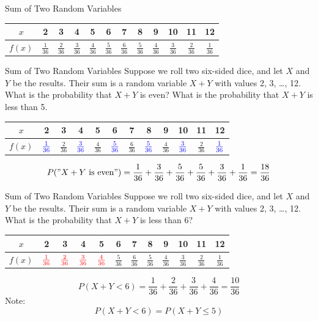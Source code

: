 \documentclass[handout]{beamer}
\newcommand{\blue}[1]{{\color{blue} #1}}
\newcommand{\red}[1]{{\color{red} #1}}
\begin{document}
\begin{frame}{Sum of Two Random Variables}
\begin{center}
    \vspace{-.5cm}
    \renewcommand{\arraystretch}{1.5}
    \begin{tabular}{c||c|c|c|c|c|c|c|c|c|c|c|}
    $x$ & 2 & 3 & 4 & 5 & 6 & 7 & 8 & 9 & 10 & 11 & 12 \\ \hline
    $f(x)$ & $\frac1{36}$ & $\frac2{36}$ & $\frac3{36}$ & $\frac4{36}$ & $\frac5{36}$ & $\frac6{36}$ & $\frac5{36}$ & $\frac4{36}$ & $\frac3{36}$ & $\frac2{36}$ & $\frac1{36}$
    \end{tabular}
    \end{center}
\end{frame}

\begin{frame}{Sum of Two Random Variables}
    Suppose we roll two six-sided dice, and let $X$ and $Y$ be the results. Their sum is a random variable $X+Y$ with values 2, 3, \dots, 12. What is the probability that $X+Y$ is even?  What is the probability that $X+Y$ is less than 5.
    
    \begin{center}
    \renewcommand{\arraystretch}{1.5}
    \begin{tabular}{c||c|c|c|c|c|c|c|c|c|c|c|}
    $x$ & 2 & 3 & 4 & 5 & 6 & 7 & 8 & 9 & 10 & 11 & 12 \\ \hline
    $f(x)$ & $\blue{\frac1{36}}$ & $\frac2{36}$ & $\blue{\frac3{36}}$ & $\frac4{36}$ & $\blue{\frac5{36}}$ & $\frac6{36}$ & $\blue{\frac5{36}}$ & $\frac4{36}$ & $\blue{\frac3{36}}$ & $\frac2{36}$ & $\blue{\frac1{36}}$
    \end{tabular}
    \end{center}
    \pause
    $$P("X+Y \text{ is even}") = \frac1{36} + \frac3{36} + \frac5{36} + \frac5{36} + \frac3{36} + \frac1{36} = \frac{18}{36}$$
\end{frame}

\begin{frame}{Sum of Two Random Variables}
    Suppose we roll two six-sided dice, and let $X$ and $Y$ be the results. Their sum is a random variable $X+Y$ with values 2, 3, \dots, 12. What is the probability that $X+Y$ is less than 6?
    
    \begin{center}
    \pause \begin{tabular}{c||c|c|c|c|c|c|c|c|c|c|c|}
    $x$ & 2 & 3 & 4 & 5 & 6 & 7 & 8 & 9 & 10 & 11 & 12 \\ \hline
    $f(x)$ & $ \red{\frac1{36}}$ & $\red{\frac2{36}}$ & $\red{\frac3{36}}$ & $\red{\frac4{36}}$ & $\frac5{36}$ & $\frac6{36}$ & $\frac5{36}$ & $\frac4{36}$ & $\frac3{36}$ & $\frac2{36}$ & $\frac1{36}$
\end{tabular}
\end{center}
    \pause
    $$ P(X+Y<6) = \frac{1}{36} + \frac{2}{36} + \frac{3}{36} + \frac{4}{36} = \frac{10}{36}$$
    Note:
    $$ P(X+Y < 6) = P(X+Y \leq 5) $$
    
\end{frame}
\end{document}
